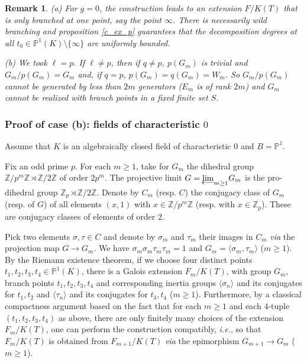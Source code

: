 \documentclass[12pt,english]{amsart}
\newtheorem{twisting lemma}[theorem]{Twisting lemma}
\newtheorem{remark}[theorem]{Remark}
\begin{document}
\begin{remark} \label{rem:l=p-and-g2}
(a) For $g=0$, the construction leads to an extension $F/K(T)$ that is only branched at one point, say the point $\infty$. There is necessarily wild branching and proposition \ref{c_ex_p} guarantees that the decomposition degrees at all $t_0\in {\mathbb{P}}^1(K)\setminus\{\infty\}$ are uniformly bounded.
\vskip 1mm

\noindent
(b) We took $\ell = p$. If $\ell \not= p$, then if $q\not=p$, $p(G_m)$ is trivial and $G_m/p(G_m)=G_m$  and,  if $q=p$, $p(G_m)=q(G_m)=W_m$. So $G_m/p(G_m)$ cannot be generated by less than $2m$ generators ($E_m$ is of rank $2m$) and $G_m$ cannot be realized with branch points in a fixed finite set $S$.
\end{remark}

\subsubsection{Proof of case (b): fields of characteristic $0$} \label{ssec:K=Qbar}

Assume that $K$ is an algebraically closed field of characteristic $0$ and $B={\mathbb{P}}^1$.

Fix an odd prime $p$. For each $m\geq 1$, take for $G_m$ the dihedral group $\mathbb{Z}/p^m\mathbb{Z}\rtimes \mathbb{Z}/2\mathbb{Z}$ of order $2p^m$. The projective limit $G={\mathop{\oalign{lim\cr
\hidewidth$\longleftarrow$\hidewidth\cr}}}_{m\geq 1} G_m$ is the pro-dihedral group ${\mathbb{Z}}_p \rtimes {\mathbb{Z}}/2{\mathbb{Z}}$. Denote by $C_m$  (resp. $C$) the conjugacy class of $G_m$ (resp. of $G$) of all elements $(x,1)$ with $x\in {\mathbb{Z}}/p^m{\mathbb{Z}}$ (resp. with $x\in {\mathbb{Z}}_p$). These are conjugacy classes of elements of order $2$.

Pick two elements  $\sigma, \tau\in C$ and denote by $\sigma_m$ and $\tau_m$ their images in $C_m$ {\it via} the projection map $G\rightarrow G_m$. We have $\sigma_m \sigma_m \tau_m \tau_m=1$ and $G_m=\langle \sigma_m,\tau_m\rangle$ ($m\geq 1$). By the Riemann existence theorem, if we choose four distinct points $t_1, t_2, t_3, t_4\in \mathbb{P}^1(K)$, there is a Galois extension $F_m/K(T)$, with group $G_m$, branch points $t_1, t_2, t_3, t_4$ and corresponding inertia groups $\langle \sigma_n\rangle$ and its conjugates for $t_1,t_2$ and $\langle\tau_n\rangle$ and its conjugates for 
$t_3,t_4$ ($m\geq 1$). Furthermore, by a classical compactness argument based on the fact that for each $m\geq 1$ and each $4$-tuple $(t_1, t_2, t_3, t_4)$ as above, there are only finitely many choices of the extension $F_m/K(T)$, one can perform  the construction compatibly, {\it i.e.}, so that $F_m/K(T)$ is  obtained from $F_{m+1}/K(T)$ {\it via} the epimorphism $G_{m+1}\rightarrow G_m$ ($m\geq 1$).
\end{document}
